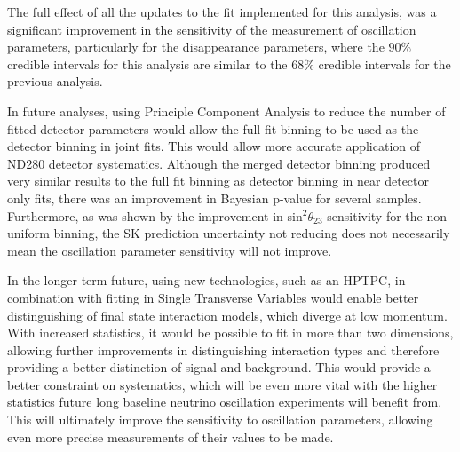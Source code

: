 The full effect of all the updates to the fit implemented for this analysis, was a significant improvement in the sensitivity of the measurement of oscillation parameters, particularly for the disappearance parameters, where the $90\%$ credible intervals for this analysis are similar to the $68\%$ credible intervals for the previous analysis.

In future analyses, using Principle Component Analysis to reduce the number of fitted detector parameters would allow the full fit binning to be used as the detector binning in joint fits. This would allow more accurate application of ND280 detector systematics. Although the merged detector binning produced very similar results to the full fit binning as detector binning in near detector only fits, there was an improvement in Bayesian p-value for several samples. Furthermore, as was shown by the improvement in sin$^2\theta_{23}$ sensitivity for the non-uniform binning, the SK prediction uncertainty not reducing does not necessarily mean the oscillation parameter sensitivity will not improve.

In the longer term future, using new technologies, such as an HPTPC, in combination with fitting in Single Transverse Variables would enable better distinguishing of final state interaction models, which diverge at low momentum. With increased statistics, it would be possible to fit in more than two dimensions, allowing further improvements in distinguishing interaction types and therefore providing a better distinction of signal and background. This would provide a better constraint on systematics, which will be even more vital with the higher statistics future long baseline neutrino oscillation experiments will benefit from. This will ultimately improve the sensitivity to oscillation parameters, allowing even more precise measurements of their values to be made. 

\newpage